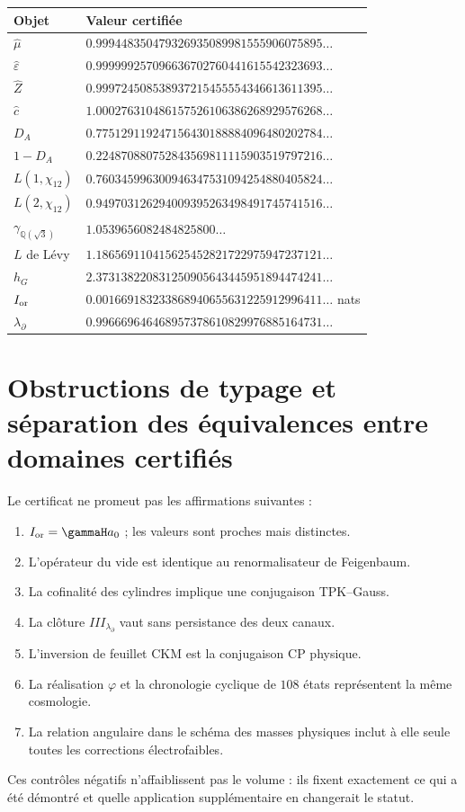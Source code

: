 \begin{longtable}{@{}>{\raggedright\arraybackslash}p{}>{\raggedright\arraybackslash}p{}@{}}
\toprule
Objet & Valeur certifiée\\
\midrule
\endhead
\(\widehat\mu\) & \(0.999448350479326935089981555906075895\ldots\)\\
\(\widehat\varepsilon\) & \(0.999999257096636702760441615542323693\ldots\)\\
\(\widehat Z\) & \(0.999724508538937215455554346613611395\ldots\)\\
\(\widehat c\) & \(1.000276310486157526106386268929576268\ldots\)\\
\(D_A\) & \(0.775129119247156430188884096480202784\ldots\)\\
\(1-D_A\) & \(0.224870880752843569811115903519797216\ldots\)\\
\(L(1,\chi_{12})\) & \(0.760345996300946347531094254880405824\ldots\)\\
\(L(2,\chi_{12})\) & \(0.949703126294009395263498491745741516\ldots\)\\
\(\gamma_{\mathbb Q(\sqrt3)}\) & \(1.0539656082484825800\ldots\)\\
\(L\) de Lévy & \(1.186569110415625452821722975947237121\ldots\)\\
\(h_G\) & \(2.373138220831250905643445951894474241\ldots\)\\
\(I_{\rm or}\) & \(0.001669183233868940655631225912996411\ldots\) nats\\
\(\lambda_\partial\) & \(0.996669646468957378610829976885164731\ldots\)\\
\bottomrule
\end{longtable}

\section{Obstructions de typage et séparation des équivalences entre domaines certifiés}

Le certificat ne promeut pas les affirmations suivantes :

\begin{enumerate}
\item \(I_{\rm or}=\gammaH a_0\) ; les valeurs sont proches mais distinctes.
\item L’opérateur du vide est identique au renormalisateur de Feigenbaum.
\item La cofinalité des cylindres implique une conjugaison TPK--Gauss.
\item La clôture \(III_{\lambda_\partial}\) vaut sans persistance des deux canaux.
\item L’inversion de feuillet CKM est la conjugaison CP physique.
\item La réalisation \(\varphi\) et la chronologie cyclique de \(108\) états
représentent la même cosmologie.
\item La relation angulaire dans le schéma des masses physiques inclut à elle seule toutes les corrections électrofaibles.
\end{enumerate}

Ces contrôles négatifs n’affaiblissent pas le volume : ils fixent exactement ce qui a été démontré et quelle application supplémentaire en changerait le statut.
